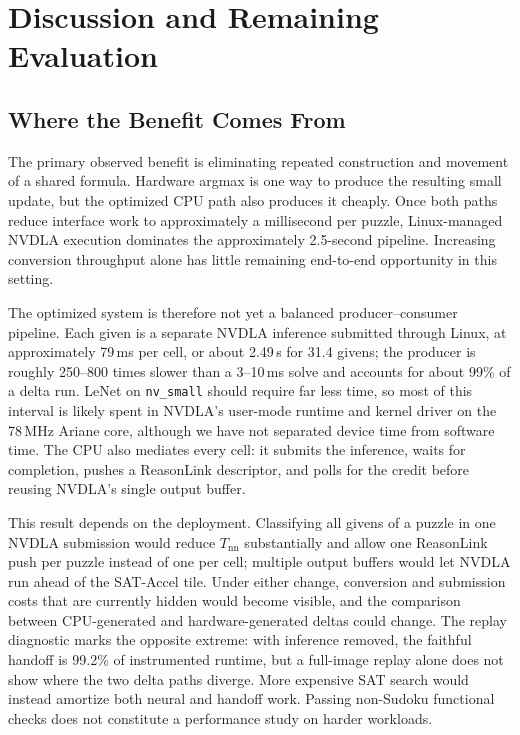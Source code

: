\section{Discussion and Remaining Evaluation}
\label{sec:discussion}
\subsection{Where the Benefit Comes From}
The primary observed benefit is eliminating repeated construction and movement of a shared formula. Hardware argmax is one way to produce the resulting small update, but the optimized CPU path also produces it cheaply. Once both paths reduce interface work to approximately a millisecond per puzzle, Linux-managed NVDLA execution dominates the approximately 2.5-second pipeline. Increasing conversion throughput alone has little remaining end-to-end opportunity in this setting.

The optimized system is therefore not yet a balanced producer--consumer pipeline. Each given is a separate NVDLA inference submitted through Linux, at approximately 79\,ms per cell, or about 2.49\,s for 31.4 givens; the producer is roughly 250--800 times slower than a 3--10\,ms solve and accounts for about 99\% of a delta run. LeNet on \texttt{nv\_small} should require far less time, so most of this interval is likely spent in NVDLA's user-mode runtime and kernel driver on the 78\,MHz Ariane core, although we have not separated device time from software time. The CPU also mediates every cell: it submits the inference, waits for completion, pushes a ReasonLink descriptor, and polls for the credit before reusing NVDLA's single output buffer.

This result depends on the deployment. Classifying all givens of a puzzle in one NVDLA submission would reduce $T_{\mathrm{nn}}$ substantially and allow one ReasonLink push per puzzle instead of one per cell; multiple output buffers would let NVDLA run ahead of the SAT-Accel tile. Under either change, conversion and submission costs that are currently hidden would become visible, and the comparison between CPU-generated and hardware-generated deltas could change. The replay diagnostic marks the opposite extreme: with inference removed, the faithful handoff is 99.2\% of instrumented runtime, but a full-image replay alone does not show where the two delta paths diverge. More expensive SAT search would instead amortize both neural and handoff work. Passing non-Sudoku functional checks does not constitute a performance study on harder workloads.

